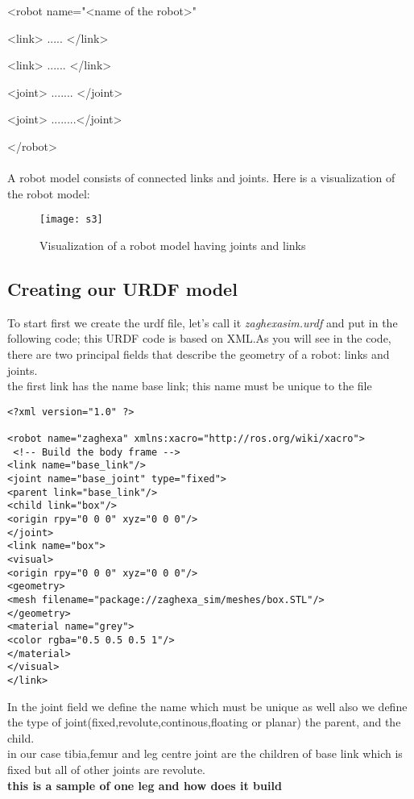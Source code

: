 \documentclass[a4paper]{article}
\begin{document}
<robot name="<name of the robot>"

  <link>  ..... </link>

  <link> ...... </link>

  <joint> ....... </joint>

  <joint> ........</joint>

</robot>
\\\\A robot model consists of connected links and joints. Here is a visualization of the robot model:
\begin{figure}[h]
	\centering
	\texttt{[image: s3]}
	\caption{Visualization of a robot model having joints and links}
	\label{fig:s3}
\end{figure}

\subsection{Creating our URDF model}
To start first we create the urdf file, let's call it\textit{ zaghexasim.urdf} and put in
the following code; this URDF code is based on XML.As you will see in the code, there are two principal fields that describe the geometry of a robot: links and joints.\\
the first link has the name base link; this name must be unique to the file\\
\begin{lstlisting}
<?xml version="1.0" ?>

<robot name="zaghexa" xmlns:xacro="http://ros.org/wiki/xacro">
 <!-- Build the body frame -->
<link name="base_link"/>
<joint name="base_joint" type="fixed">
<parent link="base_link"/>
<child link="box"/>
<origin rpy="0 0 0" xyz="0 0 0"/>
</joint>
<link name="box">
<visual>
<origin rpy="0 0 0" xyz="0 0 0"/>
<geometry>
<mesh filename="package://zaghexa_sim/meshes/box.STL"/>
</geometry>
<material name="grey">
<color rgba="0.5 0.5 0.5 1"/>
</material>
</visual>
</link>

\end{lstlisting}
In the joint field we define the name which must be unique as well also we define 
the type of joint(fixed,revolute,continous,floating or planar) the parent, and the child.\\
in our case tibia,femur and leg centre joint are the children of base link which is fixed but all of other joints are revolute.\\
\textbf{this is a sample of one leg and how does it build}\\
\end{document}
